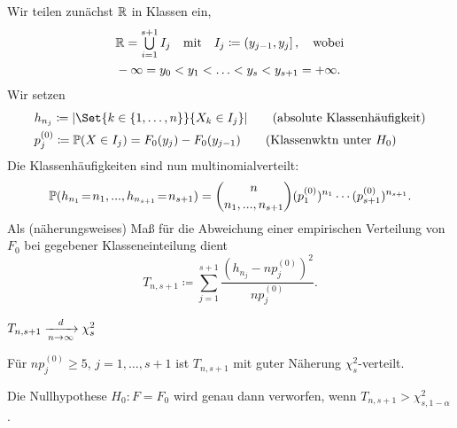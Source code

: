\documentclass{cheat-sheet}
\renewcommand{\P}{\mathbb{P}} %
\begin{document}

\begin{verf}
  Wir teilen zunächst $\mathbb{R}$ in Klassen ein,
  \begin{align*}
    & \R = \bigcup_{i=1}^{s+1} I_j
    \quad \text{mit} \quad
    I_j \coloneqq \ocinterval{y_{j-1}}{y_j},
    \quad
    \text{wobei} \\
    & - \infty = y_0 < y_1 < \ldots < y_s < y_{s+1} = + \infty.
  \end{align*}
  Wir setzen
  \begin{align*}
    & h_{n_j} \coloneqq \abs{\Set{k \in \{ 1, \ldots, n \}}{X_k \in I_j}} \tag{absolute Klassenhäufigkeit} \\
    & p_j^{(0)} \coloneqq \P(X \in I_j) = F_0(y_j) - F_0(y_{j-1}) \tag{Klassenwktn unter $H_0$}
  \end{align*}
  Die Klassenhäufigkeiten sind nun multinomialverteilt:
  \[ \P(h_{n_1} \!=\! n_1, \nldots, h_{n_{s+1}} \!=\! n_{s+1}) = \binom{n}{n_1, \nldots, n_{s+1}} (p_1^{(0)})^{n_1} \cdots (p_{s+1}^{(0)})^{n_{s+1}}. \]
  Als (näherungsweises) Maß für die Abweichung einer empirischen Verteilung von $F_0$ bei gegebener Klasseneinteilung dient
  \[ T_{n,s+1} \coloneqq \sum_{j=1}^{s+1} \frac{(h_{n_j} - n p_j^{(0)})^2}{n p_j^{(0)}}. \]
\end{verf}

\begin{satz}
  $T_{n,s+1} \xrightarrow[n \to \infty]{d} \chi_s^2$
\end{satz}

\begin{faustregel}
  Für $n p_j^{(0)} \geq 5$, $j = 1, \ldots, s+1$ ist $T_{n,s+1}$ mit guter Näherung $\chi_s^2$-verteilt.
\end{faustregel}


\begin{entscheidungsregel}
  Die Nullhypothese $H_0 : F = F_0$ wird genau dann verworfen, wenn $T_{n,s+1} > \chi^2_{s,1-\alpha}$.
\end{entscheidungsregel}
\end{document}
